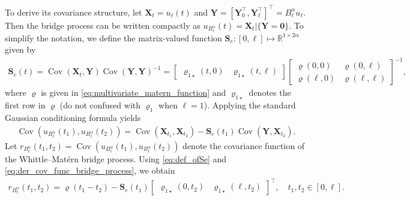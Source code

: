 \documentclass[11pt,a4paper]{article}
\theoremstyle{plain}
\theoremstyle{definition}
\begin{document}
To derive its covariance structure, let $\mathbf{X}_t = u_{\ell}(t)$ and $\mathbf{Y} = [\mathbf{Y}_0^\top, \mathbf{Y}_{\ell}^\top]^\top = B_{\ell}^\alpha u_{\ell}$. Then the bridge process can be written compactly as $u_{B_{\ell}^\alpha}(t) = \mathbf{X}_t|\{\mathbf{Y} =\mathbf{0}\}$. To simplify the notation,  we define the matrix-valued function $\mathbf{S}_e : [0,\ell] \mapsto \mathbb{R}^{1 \times 2\alpha}$ given by
\begin{align}
\label{eq:def_ofSe}
    \mathbf{S}_e(t) = \operatorname{Cov}(\mathbf{X}_{t},\mathbf{Y})\operatorname{Cov}(\mathbf{Y},\mathbf{Y})^{-1} = 
    \begin{bmatrix}
			\boldsymbol{\varrho}_{1\star}(t,0) & \boldsymbol{\varrho}_{1\star}(t,\ell) 
		\end{bmatrix}
		\begin{bmatrix}
			\boldsymbol{\varrho}(0,0) & \boldsymbol{\varrho}(0,\ell) \\
			\boldsymbol{\varrho}(\ell,0) & \boldsymbol{\varrho}(\ell,\ell)
		\end{bmatrix}^{-1},
\end{align}
where $\boldsymbol{\varrho}$ is given in \eqref{eq:multivariate_matern_function} and $\boldsymbol{\varrho}_{1\star}$ denotes the first row in $\boldsymbol{\varrho}$ (do not confused with $\boldsymbol{\varrho}_1$ when $\ell=1$). Applying the standard Gaussian conditioning formula yields
\begin{align}
\label{eq:der_cov_func_bridge_process}
    \operatorname{Cov}(u_{B_{\ell}^\alpha}(t_1), u_{B_{\ell}^\alpha}(t_2)) =   \operatorname{Cov}(\mathbf{X}_{t_1},\mathbf{X}_{t_2}) - \mathbf{S}_e(t_1)\operatorname{Cov}(\mathbf{Y},\mathbf{X}_{t_2}).
\end{align}
Let $r_{B_{\ell}^\alpha}(t_1,t_2) = \operatorname{Cov}(u_{B_{\ell}^\alpha}(t_1), u_{B_{\ell}^\alpha}(t_2))$ denote the covariance function of the Whittle--Matérn bridge process. Using \eqref{eq:def_ofSe} and \eqref{eq:der_cov_func_bridge_process}, we obtain
\begin{align}
\label{eq:covariance_for_bridge_processes}
	r_{B_{\ell}^\alpha}(t_1,t_2)  = \varrho(t_1-t_2) - \mathbf{S}_e(t_1)
		\begin{bmatrix}
			\boldsymbol{\varrho}_{1\star}(0,t_2) &
			\boldsymbol{\varrho}_{1\star}(\ell,t_2) 
		\end{bmatrix}^\top,\quad t_1,t_2\in[0,\ell].
\end{align} 		
\end{document}
